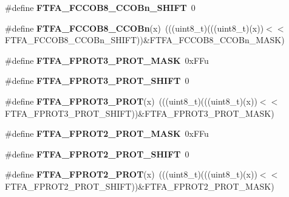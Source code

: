 \begin{DoxyCompactItemize}
\#define {\bfseries F\+T\+F\+A\+\_\+\+F\+C\+C\+O\+B8\+\_\+\+C\+C\+O\+Bn\+\_\+\+S\+H\+I\+FT}~0
\item 
\mbox{\label{group___f_t_f_a___register___masks_ga30cf95c2ee60990f4f30e05bd0ee29d8}} 
\#define {\bfseries F\+T\+F\+A\+\_\+\+F\+C\+C\+O\+B8\+\_\+\+C\+C\+O\+Bn}(x)~(((uint8\+\_\+t)(((uint8\+\_\+t)(x))$<$$<$F\+T\+F\+A\+\_\+\+F\+C\+C\+O\+B8\+\_\+\+C\+C\+O\+Bn\+\_\+\+S\+H\+I\+FT))\&F\+T\+F\+A\+\_\+\+F\+C\+C\+O\+B8\+\_\+\+C\+C\+O\+Bn\+\_\+\+M\+A\+SK)
\item 
\mbox{\label{group___f_t_f_a___register___masks_gaa5d3fe6e00716f1d147e22799ba5b7ae}} 
\#define {\bfseries F\+T\+F\+A\+\_\+\+F\+P\+R\+O\+T3\+\_\+\+P\+R\+O\+T\+\_\+\+M\+A\+SK}~0x\+F\+Fu
\item 
\mbox{\label{group___f_t_f_a___register___masks_ga35d09e54593dc5d05e0946e9ca3ae42b}} 
\#define {\bfseries F\+T\+F\+A\+\_\+\+F\+P\+R\+O\+T3\+\_\+\+P\+R\+O\+T\+\_\+\+S\+H\+I\+FT}~0
\item 
\mbox{\label{group___f_t_f_a___register___masks_gac94c3029a8dbe39595bf14c61e4a8e95}} 
\#define {\bfseries F\+T\+F\+A\+\_\+\+F\+P\+R\+O\+T3\+\_\+\+P\+R\+OT}(x)~(((uint8\+\_\+t)(((uint8\+\_\+t)(x))$<$$<$F\+T\+F\+A\+\_\+\+F\+P\+R\+O\+T3\+\_\+\+P\+R\+O\+T\+\_\+\+S\+H\+I\+FT))\&F\+T\+F\+A\+\_\+\+F\+P\+R\+O\+T3\+\_\+\+P\+R\+O\+T\+\_\+\+M\+A\+SK)
\item 
\mbox{\label{group___f_t_f_a___register___masks_ga17b0f04e6c61b3683a99ef21674d8329}} 
\#define {\bfseries F\+T\+F\+A\+\_\+\+F\+P\+R\+O\+T2\+\_\+\+P\+R\+O\+T\+\_\+\+M\+A\+SK}~0x\+F\+Fu
\item 
\mbox{\label{group___f_t_f_a___register___masks_ga7c2381deecb19163451591155ba5a05e}} 
\#define {\bfseries F\+T\+F\+A\+\_\+\+F\+P\+R\+O\+T2\+\_\+\+P\+R\+O\+T\+\_\+\+S\+H\+I\+FT}~0
\item 
\mbox{\label{group___f_t_f_a___register___masks_gab3afd3ff3730b2fa996e86e53260db59}} 
\#define {\bfseries F\+T\+F\+A\+\_\+\+F\+P\+R\+O\+T2\+\_\+\+P\+R\+OT}(x)~(((uint8\+\_\+t)(((uint8\+\_\+t)(x))$<$$<$F\+T\+F\+A\+\_\+\+F\+P\+R\+O\+T2\+\_\+\+P\+R\+O\+T\+\_\+\+S\+H\+I\+FT))\&F\+T\+F\+A\+\_\+\+F\+P\+R\+O\+T2\+\_\+\+P\+R\+O\+T\+\_\+\+M\+A\+SK)
$$
\end{DoxyCompactItemize}
